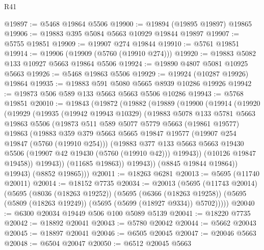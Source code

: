 \begin{lexlean}{R41}
\begin{coremodule}
@19897 := @5468 @19864 @5506
@19900 := @19894 (@19895 @19897) @19865
@19906 := @19883 @395 @5084 @5663 @10929 @19844 @19897
@19907 := @5755 @19851
@19909 := @19907 @274 @19844
@19910 := @5761 @19851
@19914 := @19906 (@19909 (@5760 (@19910 @274)))
@19920 := @19883 @5082 @133 @10927 @5663 @19864 @5506
@19924 := @19890 @4807 @5081 @10925 @5663
@19926 := @5468 @19863 @5506
@19929 := @19924 (@10287 @19926) @19864
@19935 := @19883 @591 @5080 @5665 @8939 @10286 @19926
@19942 := @19873 @506 @589 @133 @5663 @5663 @5506 @10286
@19943 := @5768 @19851
@20010 := @19843
    (@19872
      (@19882
        (@19889
          (@19900
            (@19914
              (@19920
                (@19929
                  (@19935
                    (@19942 @19943 @10329)
                    (@19883
                      @5078
                      @133
                      @5781
                      @5663
                      @19863
                      @5506
                      (@19873
                        @511
                        @589
                        @5077
                        @5779
                        @5663
                        (@19861 @19577)
                        @19863
                        (@19883
                          @359
                          @379
                          @5663
                          @5665
                          @19847
                          @19577
                          (@19907 @254 @19847 (@5760 (@19910 @254)))
                          (@19883
                            @377
                            @133
                            @5663
                            @5663
                            @19430
                            @5506
                            (@19907 @42 @19430 (@5760 (@19910 @42)))
                            @19943))
                        (@10126 @19847 @19458))
                      @19943))
                  (@11685 @19863))
                @19943))
            (@8845 @19844 @19864))
          @19943)
        (@8852 @19865)))
@20011 := @18263 @6281
@20013 := @5695 (@11740 @20011)
@20014 := @18152 @7735
@20034 := @20013
    (@5695
      (@11743 @20014)
      (@5695
        (@8036 (@18263 @19252))
        (@5695
          (@6366 (@18263 @19258))
          (@5695 (@5809 (@18263 @19249)) (@5695 (@5699 (@18927 @9334)) @5702)))))
@20040 := @6300 @20034 @19449 @506 @100 @5089 @5139
@20041 := @18220 @7735
@20042 := @18892 @20041
@20043 := @5780 @20042
@20044 := @5662 @20043
@20045 := @18897 @20041
@20046 := @6505 @20045
@20047 := @20046 @5663
@20048 := @6504 @20047
@20050 := @6512 @20045 @5663

\end{coremodule}
\end{lexlean}

